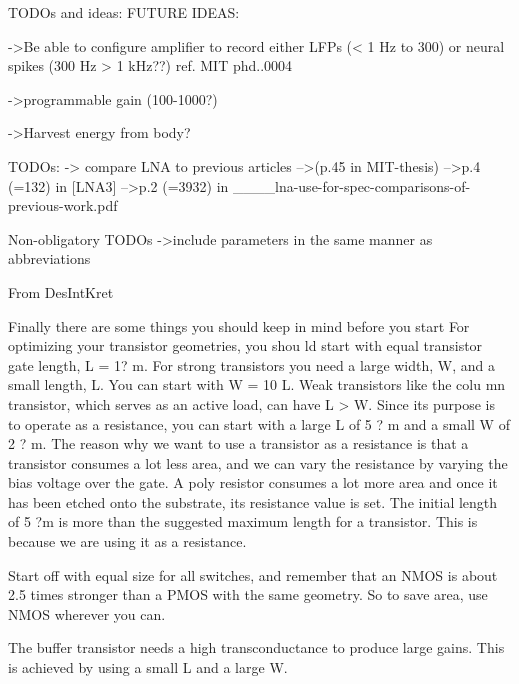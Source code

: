 TODOs and ideas:
  FUTURE IDEAS:
  {
    ->Be able to configure amplifier to record either LFPs (< 1 Hz to 300) or neural spikes (300 Hz > 1 kHz??)
    ref. MIT phd..0004
    
    ->programmable gain (100-1000?)
    
    ->Harvest energy from body?
   }
    
  TODOs:
  {
    -> compare LNA to previous articles 
            -->(p.45 in MIT-thesis) 
	    -->p.4 (=132) in [LNA3]
	    -->p.2 (=3932) in ____lna-use-for-spec-comparisons-of-previous-work.pdf	   
  }
  
  Non-obligatory TODOs
  {
    ->include parameters in the same manner as abbreviations
  }
  
  
  From DesIntKret
  {
    Finally there are some things you should keep in mind before you start 
    For  optimizing  your  transistor  geometries,  you  shou ld  start  with  equal  transistor  gate  length, 
    L = 1? m.  For  strong  transistors  you  need  a  large  width,  W,  and  a  small  length,  L.  You  can start  with  W = 10 L.  Weak  transistors  like  the  colu
    mn  transistor,  which  serves  as  an  active load, can have L > W. Since its purpose is to operate as a resistance, you can start with a large 
    L of 5 ? m and a small W of 2 ? m. The reason why we want to use a transistor as a resistance is that a transistor consumes a lot less area, and 
    we can vary the resistance by varying the bias voltage  over  the  gate.  A  poly  resistor  consumes  a  lot  more  area  and  once  it  has  been  etched 
    onto  the  substrate,  its  resistance  value  is  set.  The  initial  length  of  5 ?m  is  more  than  the suggested maximum length for a transistor. This is 
    because we are using it as a resistance. 

    Start  off  with  equal  size  for  all  switches,  and  remember  that  an  NMOS  is  about  2.5  times 
    stronger  than  a  PMOS  with  the  same  geometry.  So  to save  area,  use  NMOS  wherever  you can. 

    The  buffer  transistor  needs  a  high  transconductance to  produce  large  gains.  This  is  achieved 
    by using a small L and a large W. 
  }
